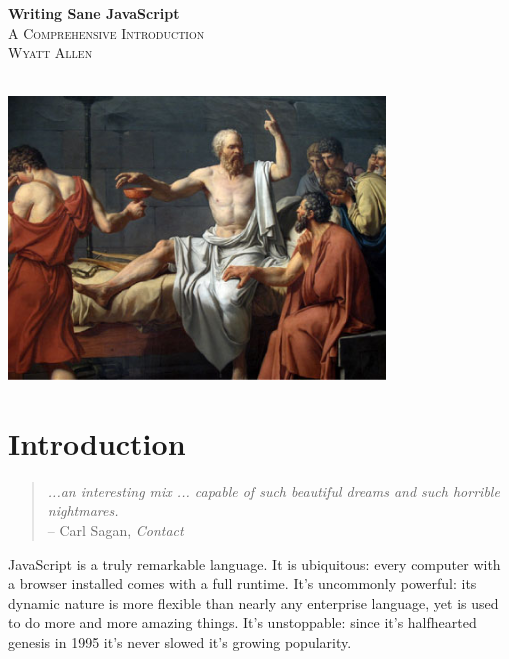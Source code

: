 \documentclass[11pt,letter]{book}
\begin{document}
    \begin{titlepage}

        \begin{center}
            { \huge \bfseries Writing Sane JavaScript}\\[0.4cm]
            
            \textsc{\Large A Comprehensive Introduction}\\[0.5cm]
            
            \textsc{Wyatt Allen}
            
            \HRule \\[2.2cm]
            
            \includegraphics[width=10cm]{socrates-hemlock}

            \vfill

        \end{center}

    \end{titlepage}
        
    \chapter{Introduction}
    \begin{quote}
        \emph{
            ...an interesting mix ... capable of such beautiful dreams and such horrible nightmares.
        } \\
        -- Carl Sagan, \emph{Contact}
    \end{quote}
    
    JavaScript is a truly remarkable language. It is ubiquitous: every computer with a browser 
    installed comes with a full runtime. It's uncommonly powerful: its dynamic nature is more 
    flexible than nearly any enterprise language, yet is used to do more and more amazing things.
    It's unstoppable: since it's halfhearted genesis in 1995 it's never slowed it's growing 
    popularity.
    
\end{document}
